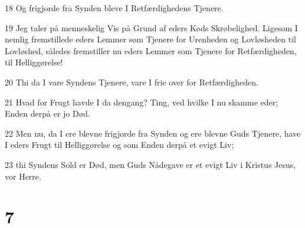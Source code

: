 \par 18 Og frigjorde fra Synden bleve I Retfærdighedens Tjenere.
\par 19 Jeg taler på menneskelig Vis på Grund af eders Køds Skrøbelighed. Ligesom I nemlig fremstillede eders Lemmer som Tjenere for Urenheden og Lovløsheden til Lovløshed, således fremstiller nu eders Lemmer som Tjenere for Retfærdigheden, til Helliggørelse!
\par 20 Thi da I vare Syndens Tjenere, vare I frie over for Retfærdigheden.
\par 21 Hvad for Frugt havde I da dengang? Ting, ved hvilke I nu skamme eder; Enden derpå er jo Død.
\par 22 Men nu, da I ere blevne frigjorde fra Synden og ere blevne Guds Tjenere, have I eders Frugt til Helliggørelse og som Enden derpå et evigt Liv;
\par 23 thi Syndens Sold er Død, men Guds Nådegave er et evigt Liv i Kristus Jesus, vor Herre.

\chapter{7}

